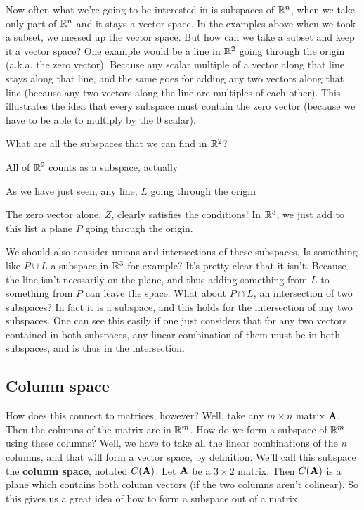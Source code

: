 Now often what we're going to be interested in is subspaces of $\mathbb{R}^n$, when we take only part of $\mathbb{R}^n$ and it stays a vector space. In the examples above when we took a subset, we messed up the vector space. But how can we take a subset and keep it a vector space? 
\bex
One example would be a line in $\mathbb{R}^2$ going through the origin (a.k.a. the zero vector). Because any scalar multiple of a vector along that line stays along that line, and the same goes for adding any two vectors along that line (because any two vectors along the line are multiples of each other). This illustrates the idea that every subspace must contain the zero vector (because we have to be able to multiply by the 0 scalar). 

What are all the subspaces that we can find in $\mathbb{R}^2$?
\bit
\item All of $\mathbb{R}^2$ counts as a subspace, actually
\item As we have just seen, any line, $L$ going through the origin 
\item The zero vector alone, $Z$, clearly satisfies the conditions! 
\eit
In $\mathbb{R}^3$, we just add to this list a plane $P$ going through the origin. 

We should also consider unions and intersections of these subspaces. Is something like $P \cup L$ a subspace in $\mathbb{R}^3$ for example? It's pretty clear that it isn't. Because the line isn't necssarily on the plane, and thus adding something from $L$ to something from $P$ can leave the space. What about $P \cap L$, an intersection of two subspaces? In fact it is a subspace, and this holds for the intersection of any two subspaces. One can see this easily if one just considers that for any two vectors contained in both subspaces, any linear combination of them must be in both subspaces, and is thus in the intersection. 
\eex

\subsection{Column space} 
How does this connect to matrices, however? Well, take any $m \times n$ matrix $\boldsymbol{\mathbf{A}}$. Then the columns of the matrix are in $\mathbb{R}^m$. How do we form a subspace of $\mathbb{R}^m$ using these columns? Well, we have to take all the linear combinations of the $n$ columns, and that will form a vector space, by definition. We'll call this subspace the \textbf{column space}, notated $C(\boldsymbol{\mathbf{A}})$. 
\bex
Let $\boldsymbol{\mathbf{A}}$ be a $3 \times 2$ matrix. Then $C(\boldsymbol{\mathbf{A}})$ is a plane which contains both column vectors (if the two columns aren't colinear). 
\eex
So this gives us a great idea of how to form a subspace out of a matrix. 
